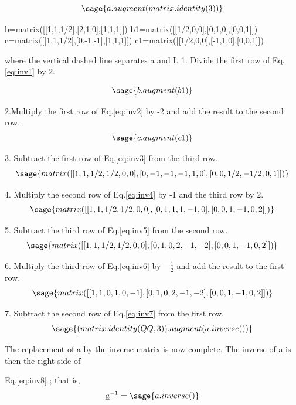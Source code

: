 \documentclass[12pt]{report}
\newcommand{\lab}[1]{
	Eq.\ref{#1}
}
\begin{document}
\begin{equation}
	\sage{a.augment(matrix.identity(3))}
	\label{eq:inv1}
\end{equation}

\begin{sagesilent}
	b=matrix([[1,1,1/2],[2,1,0],[1,1,1]])
	b1=matrix([[1/2,0,0],[0,1,0],[0,0,1]])
	c=matrix([[1,1,1/2],[0,-1,-1],[1,1,1]])
	c1=matrix([[1/2,0,0],[-1,1,0],[0,0,1]])
\end{sagesilent}

where the vertical dashed line separates \underline{a} and \underline{I}.
1. Divide the first row of \lab{eq:inv1} by 2.

\begin{equation}
	\sage{b.augment(b1)}
	\label{eq:inv2}
\end{equation}

2.Multiply the first row of \lab{eq:inv2} by -2 and add the result to
the second row.
\begin{equation}
	\sage{c.augment(c1)}
	\label{eq:inv3}
\end{equation}

3. Subtract the first row of \lab{eq:inv3} from the third row.
\begin{equation}
	\sage{matrix([[1,1,1/2,1/2,0,0],[0,-1,-1,-1,1,0],[0,0,1/2,-1/2,0,1]])}
	\label{eq:inv4}
\end{equation}

4. Multiply the second row of \lab{eq:inv4} by -1 and the third row by 2.
\begin{equation}
	\sage{matrix([[1,1,1/2,1/2,0,0],[0,1,1,1,-1,0],[0,0,1,-1,0,2]])}
	\label{eq:inv5}
\end{equation}

5. Subtract the third row of \lab{eq:inv5} from the second row.
\begin{equation}
	\sage{matrix([[1,1,1/2,1/2,0,0],[0,1,0,2,-1,-2],[0,0,1,-1,0,2]])}
	\label{eq:inv6}
\end{equation}

6. Multiply the third row of \lab{eq:inv6} by $-\frac{1}{2}$ and add the
result to the first row.
\begin{equation}
	\sage{matrix([[1,1,0,1,0,-1],[0,1,0,2,-1,-2],[0,0,1,-1,0,2]])}
	\label{eq:inv7}
\end{equation}

7. Subtract the second row of \lab{eq:inv7} from the first row.
\begin{equation} 
	\sage{(matrix.identity(QQ,3)).augment(a.inverse())}
	\label{eq:inv8}
\end{equation}

The replacement of \underline{a} by the inverse matrix is now
complete. The inverse of \underline{a} is then the right side of
\lab{eq:inv8}; that is,
\begin{equation}
	\underline{a}^{-1} = \sage{a.inverse()}
\end{equation}
\end{document}
